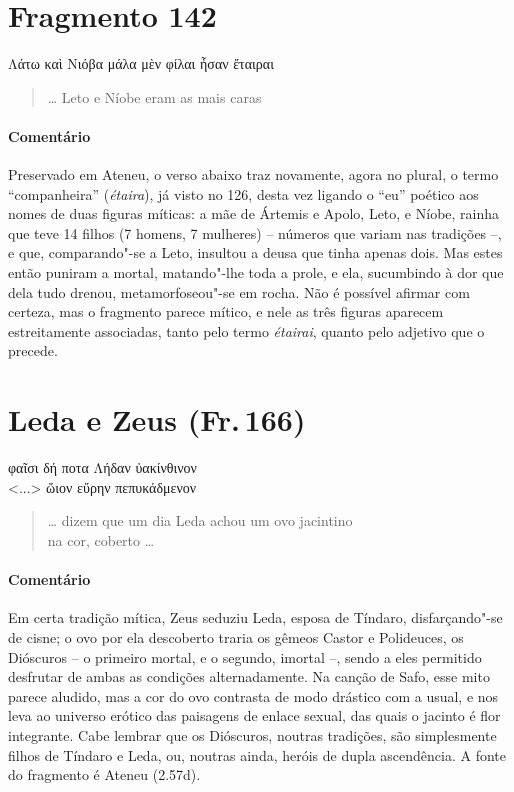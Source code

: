 \pagebreak
\section{Fragmento 142}

\begin{gkverse}
Λάτω καὶ Νιόβα μάλα μὲν φίλαι ἦσαν ἔταιραι
\end{gkverse}

\begin{verse}
\ldots{} Leto e Níobe eram as mais caras 
\end{verse}

{\paragraph{Comentário} Preservado em Ateneu, o verso abaixo traz novamente,
agora no plural, o termo ``companheira” (\textit{étaira}), já visto no
126, desta vez ligando o “eu” poético aos nomes de duas figuras míticas: a mãe de
Ártemis e Apolo, Leto, e Níobe, rainha que teve 14 filhos (7 homens, 7
mulheres) -- números que variam nas tradições --, e que, comparando"-se a Leto, insultou a deusa que tinha apenas dois.
Mas estes então puniram a mortal, matando"-lhe toda a prole, e ela, sucumbindo à dor que dela tudo drenou, metamorfoseou"-se em rocha. Não é possível afirmar
com certeza, mas o fragmento parece mítico, e nele as três figuras aparecem
estreitamente associadas, tanto pelo termo \textit{étairai}, quanto pelo
adjetivo que o precede.}



\pagebreak
\section{Leda e Zeus (Fr.\,166)}

\begin{gkverse}
φαῖσι δή ποτα Λήδαν ὐακίνθινον\\
<...> ὤιον εὔρην πεπυκάδμενον
\end{gkverse}

\begin{verse}
\ldots{} dizem que um dia Leda achou um ovo jacintino\\
na cor, coberto \ldots{}
\end{verse}

{\paragraph{Comentário} Em certa tradição mítica, Zeus seduziu Leda, esposa de Tíndaro, disfarçando"-se
de cisne; o ovo por ela descoberto traria os gêmeos Castor e Polideuces, os
Dióscuros -- o primeiro mortal, e o segundo, imortal --, sendo a eles
permitido desfrutar de ambas as condições alternadamente. Na canção de Safo,
esse mito parece aludido, mas a cor do ovo contrasta de modo drástico com a usual,
e nos leva ao universo erótico das paisagens de enlace sexual, das quais o
jacinto é flor integrante. Cabe lembrar que os Dióscuros, noutras tradições,
são simplesmente filhos de Tíndaro e Leda, ou, noutras ainda, heróis de dupla
ascendência. A fonte do fragmento é Ateneu (2.57d).}




